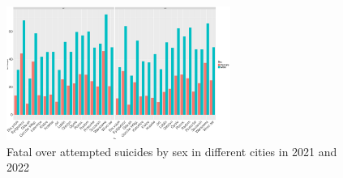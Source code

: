 \documentclass{article}
\begin{document}
\begin{figure}[H]
    \centering
    \includegraphics[width=0.65\textwidth]{imgs/sex_foa_city-2122.pdf}
    \caption{Fatal over attempted suicides by sex in different cities in 2021 and 2022}
    \label{fig:sex_foa_city-2122}
\end{figure}

%



%
%
\end{document}
